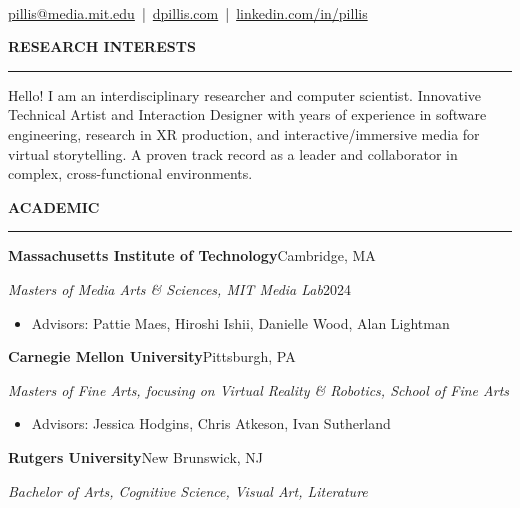\documentclass[10pt,letterpaper]{article}
\newcommand{\cvsection}[1]{%
  \par\addvspace{7pt}%
  {\large\bfseries\MakeUppercase{#1}}\par\nobreak
  \vspace{-0.55\baselineskip}\rule{\linewidth}{0.6pt}\par\nobreak\vspace{1.5pt}}
\newcommand{\entry}[4]{%
  \par\addvspace{2.5pt}%
  {\large\bfseries #1}\hfill #2\par\nobreak
  \textit{#3}\hfill #4\par\nobreak}
\newenvironment{bullets}{%
  \begin{itemize}[leftmargin=0.95em,labelsep=0.35em,itemsep=0pt,parsep=0pt,topsep=1pt,partopsep=0pt,
    label={\raisebox{0.25ex}{\tiny$\bullet$}}]}{\end{itemize}}
\begin{document}
\begin{center}
  {\LARGE\bfseries{}}\\[3pt]
  {\color{link}\href{mailto:pillis@media.mit.edu}{pillis@media.mit.edu}
  \textcolor{black}{\,|\,} \href{https://dpillis.com}{dpillis.com}
  \textcolor{black}{\,|\,} \href{https://www.linkedin.com/in/pillis/}{linkedin.com/in/pillis}}
\end{center}
\vspace{-6pt}

\cvsection{Research Interests}
Hello! I am an interdisciplinary researcher and computer scientist. Innovative Technical Artist and Interaction
Designer with years of experience in software engineering, research in XR production, and interactive/immersive
media for virtual storytelling. A proven track record as a leader and collaborator in complex, cross-functional
environments.

\cvsection{Academic}
\entry{Massachusetts Institute of Technology}{Cambridge, MA}{Masters of Media Arts \& Sciences, MIT Media Lab}{2024}
\begin{bullets}\item Advisors: Pattie Maes, Hiroshi Ishii, Danielle Wood, Alan Lightman\end{bullets}
\entry{Carnegie Mellon University}{Pittsburgh, PA}{Masters of Fine Arts, focusing on Virtual Reality \& Robotics, School of Fine Arts}{}
\begin{bullets}\item Advisors: Jessica Hodgins, Chris Atkeson, Ivan Sutherland\end{bullets}
\entry{Rutgers University}{New Brunswick, NJ}{Bachelor of Arts, Cognitive Science, Visual Art, Literature}{}
\end{document}
